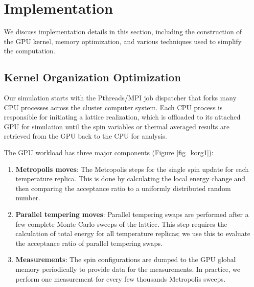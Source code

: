 \section{Implementation}




\label{section_implementation}

We discuss implementation details in this section, including the
construction of the GPU kernel, memory optimization, and various
techniques used to simplify the computation.


\subsection{Kernel Organization Optimization}

\label{section_korg}

Our simulation starts with the Pthreads/MPI job dispatcher that 
forks many CPU processes across the cluster computer system. Each CPU
process is responsible for initiating a
lattice realization, which is offloaded to its attached GPU 
for simulation until the spin variables or thermal averaged results are 
retrieved from the GPU back to the CPU for analysis. 

The GPU workload has three major components (Figure \ref{fig_korg1}):
\begin{enumerate}
\item {\bf Metropolis moves}: The Metropolis steps for the single spin
  update for each temperature replica. This is done by calculating
  the local energy change and then comparing the acceptance ratio to a
  uniformly distributed random number.
\item {\bf Parallel tempering moves}: Parallel tempering swaps are
  performed after a few complete Monte Carlo sweeps of the
  lattice. This step requires the calculation of total energy for all
  temperature replicas; we use this to evaluate the acceptance ratio
  of parallel tempering swaps.
\item {\bf Measurements}: The spin configurations are dumped to the
  GPU global memory periodically to provide data for the
  measurements. In practice, we perform one measurement for every few
  thousands Metropolis sweeps.
\end{enumerate}


